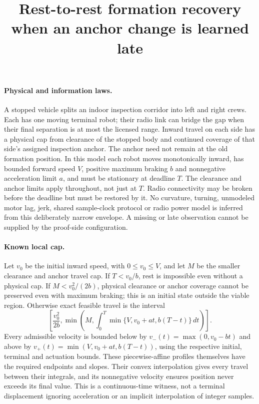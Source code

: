\documentclass{article}
\title{Rest-to-rest formation recovery when an anchor change is learned late}
\date{}
\begin{document}
\maketitle

\paragraph{Physical and information laws.}
A stopped vehicle splits an indoor inspection corridor into left and right crews. Each has one moving terminal robot; their radio link can bridge the gap when their final separation is at most the licensed range. Inward travel on each side has a physical cap from clearance of the stopped body and continued coverage of that side's assigned inspection anchor. The anchor need not remain at the old formation position. In this model each robot moves monotonically inward, has bounded forward speed $V$, positive maximum braking $b$ and nonnegative acceleration limit $a$, and must be stationary at deadline $T$. The clearance and anchor limits apply throughout, not just at $T$. Radio connectivity may be broken before the deadline but must be restored by it. No curvature, turning, unmodeled motor lag, jerk, shared sample-clock protocol or radio power model is inferred from this deliberately narrow envelope. A missing or late observation cannot be supplied by the proof-side configuration.

\paragraph{Known local cap.}
Let $v_0$ be the initial inward speed, with $0\le v_0\le V$, and let $M$ be the smaller clearance and anchor travel cap. If $T<v_0/b$, rest is impossible even without a physical cap. If $M<v_0^2/(2b)$, physical clearance or anchor coverage cannot be preserved even with maximum braking; this is an initial state outside the viable region. Otherwise exact feasible travel is the interval
\[
\left[\frac{v_0^2}{2b},
      \min\left(M,\int_0^T\min\{V,v_0+at,b(T-t)\}\,dt\right)\right].
\]
Every admissible velocity is bounded below by $v_-(t)=\max(0,v_0-bt)$ and above by $v_+(t)=\min(V,v_0+at,b(T-t))$, using the respective initial, terminal and actuation bounds. These piecewise-affine profiles themselves have the required endpoints and slopes. Their convex interpolation gives every travel between their integrals, and its nonnegative velocity ensures position never exceeds its final value. This is a continuous-time witness, not a terminal displacement ignoring acceleration or an implicit interpolation of integer samples.
\end{document}
